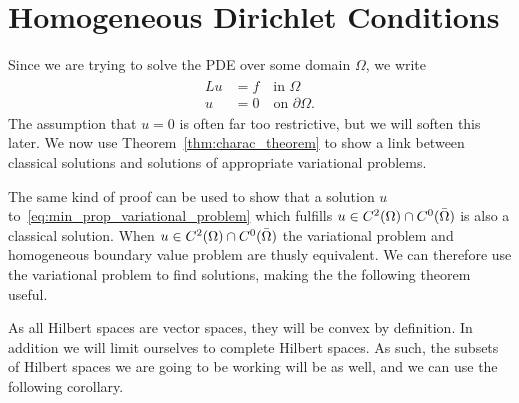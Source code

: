 \section{Homogeneous Dirichlet Conditions}
Since we are trying to solve the PDE over some domain $\Omega$, we write
\begin{align}
\begin{split}
    Lu &= f \quad \text{in } \Omega \label{eq:b_v_problem_homogeneous} \\
    u &= 0 \quad \text{on } \partial \Omega. 
\end{split}
\end{align}
The assumption that $u=0$ is often far too restrictive, but we will soften this later.
We now use Theorem~\ref{thm:charac_theorem} to show a link between classical 
solutions and solutions of appropriate variational problems.

The same kind of proof can be used to show that a solution $u$ to~\eqref{eq:min_prop_variational_problem} which fulfills 
$u\in C^2(\Omega) \cap C^0(\bar{\Omega})$ is also a classical solution. 
When $u\in C^2(\Omega) \cap C^0(\bar{\Omega})$ the variational problem and 
homogeneous boundary value problem are thusly equivalent.
We can therefore use the variational problem to find solutions, making the
 the following theorem useful.

As all Hilbert spaces are vector spaces, they will be convex by definition. In addition we will limit ourselves to complete Hilbert spaces.
As such, the subsets of Hilbert spaces we are going to be working will be as well,
and we can use the following corollary.


